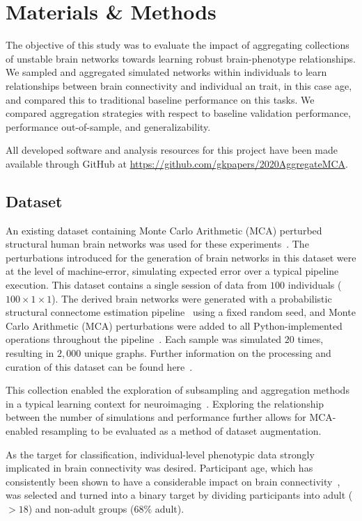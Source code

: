 \documentclass[10pt]{SelfArx} %
\begin{document}
\section*{Materials \& Methods}

The objective of this study was to evaluate the impact of aggregating collections of unstable brain networks towards
learning robust brain-phenotype relationships. We sampled and aggregated simulated networks within individuals to learn
relationships between brain connectivity and individual an trait, in this case age, and compared this to traditional
baseline performance on this tasks. We compared aggregation strategies with respect to baseline validation performance,
performance out-of-sample, and generalizability.

All developed software and analysis resources for this project have been made available through GitHub at
\url{https://github.com/gkpapers/2020AggregateMCA}.

\subsection*{Dataset}

An existing dataset containing Monte Carlo Arithmetic (MCA) perturbed structural human brain networks was used for
these experiments~\cite{Kiar2020-yz}. The perturbations introduced for the generation of brain networks in this dataset
were at the level of machine-error, simulating expected error over a typical pipeline execution. This dataset contains
a single session of data from $100$ individuals ($100\times 1 \times1$). The derived brain networks were generated with
a probabilistic structural connectome estimation pipeline~\cite{Garyfallidis2014-ql} using a fixed random seed, and
Monte Carlo Arithmetic (MCA) perturbations were added to all Python-implemented operations throughout the
pipeline~\cite{Denis2016-wo,Parker1997-qq}. Each sample was simulated $20$ times, resulting in $2,000$ unique graphs.
Further information on the processing and curation of this dataset can be found here~\cite{Kiar2020-kz}.

This collection enabled the exploration of subsampling and aggregation methods in a typical learning context for
neuroimaging~\cite{Dimitriadis2017-pd,Buchanan2014-pm}. Exploring the relationship between the number of simulations
and performance further allows for MCA-enabled resampling to be evaluated as a method of dataset augmentation.

As the target for classification, individual-level phenotypic data strongly implicated in brain connectivity was
desired. Participant age, which has consistently been shown to have a considerable impact on brain
connectivity~\cite{Meier2012-ve,Wu2012-uc,Bookheimer2019-ti,Zhao2015-rm}, was selected and turned into a binary target
by dividing participants into adult ($>18$) and non-adult groups ($68\%$ adult).
\end{document}
